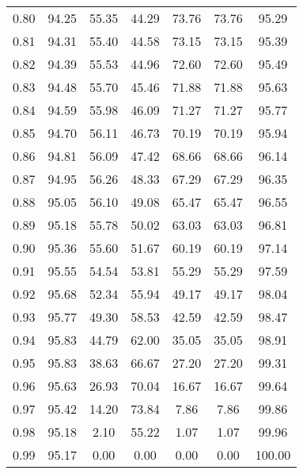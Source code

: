 \begin{tabular}{|c|c|c|c|c|c|c|}
      0.80 &     94.25 &     55.35 &      44.29 &   73.76 &      73.76 &         95.29 \\
      0.81 &     94.31 &     55.40 &      44.58 &   73.15 &      73.15 &         95.39 \\
      0.82 &     94.39 &     55.53 &      44.96 &   72.60 &      72.60 &         95.49 \\
      0.83 &     94.48 &     55.70 &      45.46 &   71.88 &      71.88 &         95.63 \\
      0.84 &     94.59 &     55.98 &      46.09 &   71.27 &      71.27 &         95.77 \\
      0.85 &     94.70 &     56.11 &      46.73 &   70.19 &      70.19 &         95.94 \\
      0.86 &     94.81 &     56.09 &      47.42 &   68.66 &      68.66 &         96.14 \\
      0.87 &     94.95 &     56.26 &      48.33 &   67.29 &      67.29 &         96.35 \\
      0.88 &     95.05 &     56.10 &      49.08 &   65.47 &      65.47 &         96.55 \\
      0.89 &     95.18 &     55.78 &      50.02 &   63.03 &      63.03 &         96.81 \\
      0.90 &     95.36 &     55.60 &      51.67 &   60.19 &      60.19 &         97.14 \\
      0.91 &     95.55 &     54.54 &      53.81 &   55.29 &      55.29 &         97.59 \\
      0.92 &     95.68 &     52.34 &      55.94 &   49.17 &      49.17 &         98.04 \\
      0.93 &     95.77 &     49.30 &      58.53 &   42.59 &      42.59 &         98.47 \\
      0.94 &     95.83 &     44.79 &      62.00 &   35.05 &      35.05 &         98.91 \\
      0.95 &     95.83 &     38.63 &      66.67 &   27.20 &      27.20 &         99.31 \\
      0.96 &     95.63 &     26.93 &      70.04 &   16.67 &      16.67 &         99.64 \\
      0.97 &     95.42 &     14.20 &      73.84 &    7.86 &       7.86 &         99.86 \\
      0.98 &     95.18 &      2.10 &      55.22 &    1.07 &       1.07 &         99.96 \\
      0.99 &     95.17 &      0.00 &       0.00 &    0.00 &       0.00 &        100.00 \\
\bottomrule
\end{tabular}
